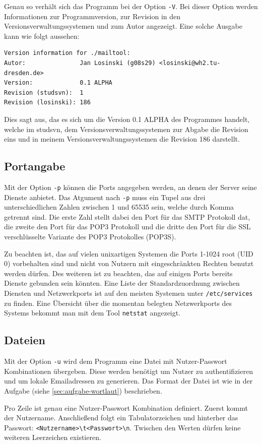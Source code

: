 \documentclass[final,a4paper,11pt,notitlepage,halfparskip]{scrreprt}
\begin{document}
Genau so verhält sich das Programm bei der Option \texttt{-V}. Bei dieser Option
werden Informationen zur Programmversion, zur Revision in den
Versionsverwaltungssystemen und zum Autor angezeigt. Eine solche Ausgabe kann
wie folgt aussehen:
\begin{verbatim}
Version information for ./mailtool:
Autor:               Jan Losinski (g08s29) <losinski@wh2.tu-dresden.de>
Version:             0.1 ALPHA
Revision (studsvn):  1
Revision (losinski): 186
\end{verbatim}
Dies sagt aus, das es sich um die Version 0.1 ALPHA des Programmes handelt,
welche im studsvn, dem Versionsverwaltungssystemen zur Abgabe die Revision eins 
und in meinem Versionsverwaltungssystemen die Revision 186 darstellt.

\subsection{Portangabe}
Mit der Option \texttt{-p} können die Ports angegeben werden, an denen der
Server seine Dienste anbietet. Das Atgument nach \texttt{-p} muss ein Tupel aus
drei unterschiedlichen Zahlen zwischen 1 und 65535 sein, welche durch Komma
getrennt sind. Die erste Zahl stellt dabei den Port für das SMTP Protokoll dat,
die zweite den Port für das POP3 Protokoll und die dritte den Port für die SSL
verschlüsselte Variante des POP3 Protokolles (POP3S). 

Zu beachten ist, das auf vielen unixartigen Systemen die Ports 1-1024 root (UID 
0) vorbehalten sind und nicht von Nutzern mit eingeschränkten Rechten benutzt 
werden dürfen. Des weiteren ist zu beachten, das auf einigen Ports bereits 
Dienste gebunden sein könnten. Eine Liste der Standardzuordnung zwischen 
Diensten und Netzwerkports ist auf den meisten Systemen unter
\texttt{/etc/services} zu finden. Eine Übersicht über die momentan belegten
Netzwerkports des Systems bekommt man mit dem Tool \texttt{netstat} angezeigt.

\subsection{Dateien}
Mit der Option \texttt{-u} wird dem Programm eine Datei mit Nutzer-Passwort
Kombinationen übergeben. Diese werden benötigt um Nutzer zu authentifizieren und
um lokale Emailadressen zu generieren. Das Format der Datei ist wie in der
Aufgabe (siehe \ref{sec:aufgabe-wortlaut}) beschrieben. 

Pro Zeile ist genau eine Nutzer-Passwort Kombination definiert. Zuerst kommt der
Nutzername. Anschließend folgt ein Tabulatorzeichen und hinterher das Passwort:
\texttt{<Nutzername>\textbackslash t<Passwort>\textbackslash n}. Twischen den
Werten dürfen keine weiteren Leerzeichen existieren.
\end{document}
